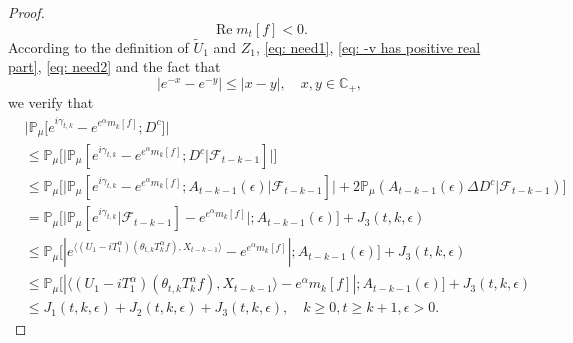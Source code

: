 \documentclass[12pt]{amsart}
\theoremstyle{plain}
\theoremstyle{definition}
\numberwithin{equation}{section}
\begin{document}
\begin{proof}
\begin{equation}
\label{eq: need2}
	\operatorname {Re} m_t[f] < 0.
\end{equation}
    According to the definition of $\tilde U_1$ and $Z_1$, \eqref{eq: need1}, \eqref{eq: -v has positive real part}, \eqref{eq: need2} and the fact that
\[
	|e^{-x} - e^{-y}| \leq |x-y|,\quad x,y \in \mathbb C_+,
\]
	we verify that
\begin{align}
\label{eq: inequality that will used later}
    &\big|\mathbb{P}_{\mu}\big[e^{i\gamma_{t,k}}-e^{e^{\alpha}m_k[f]}; D^c\big]\big|
    \\& \leq \mathbb{P}_{\mu}\Big[\big| \mathbb{P}_{\mu}[e^{i\gamma_{t,k}}-e^{e^{\alpha}m_k[f]}; D^c | \mathscr F_{t-k-1}]\big|\Big]
    \\& \leq \mathbb{P}_{\mu}\Big[\big| \mathbb{P}_{\mu}[e^{i\gamma_{t,k}}-e^{e^{\alpha}m_k[f]}; A_{t-k-1}(\epsilon)| \mathscr F_{t-k-1}]\big| + 2\mathbb P_\mu(A_{t-k-1}(\epsilon) \Delta D^c| \mathscr F_{t-k-1})\Big]
    \\& = \mathbb{P}_{\mu}\Big[ \big|\mathbb{P}_{\mu}[e^{i\gamma_{t,k}}| \mathscr F_{t-k-1}]-e^{e^{\alpha}m_k[f]}\big|;A_{t-k-1}(\epsilon)\Big] + J_3(t,k,\epsilon)
    \\& \leq \mathbb{P}_{\mu}\big[|e^{\langle (U_1 - iT_{1}^{\alpha}) (\theta_{t,k}T_k^{\alpha}f),X_{t-k-1}\rangle}-e^{e^{\alpha}m_k[f]}|;A_{t-k-1}(\epsilon)\big]+  J_3(t,k,\epsilon)
    \\& \leq \mathbb{P}_{\mu}\big[|\langle (U_1 - i T_1^\alpha)(\theta_{t,k}T_k^{\alpha}f),X_{t-k-1}\rangle-e^{\alpha}m_k[f]|;A_{t-k-1}(\epsilon)\big]+  J_3(t,k,\epsilon)
    \\&\leq J_1(t,k,\epsilon) + J_2(t,k,\epsilon)+J_3(t,k,\epsilon),
    \quad k\geq 0, t\geq k+1, \epsilon> 0.
\end{align}


\end{proof}
\end{document}
